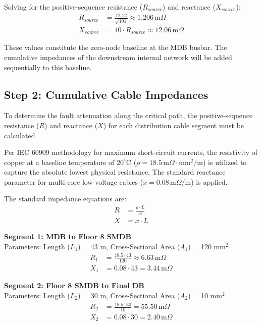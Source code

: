 \documentclass[11pt, a4paper]{article}
\begin{document}
Solving for the positive-sequence resistance ($R_{source}$) and reactance ($X_{source}$):
\begin{align}
    R_{source} &= \frac{12.12}{\sqrt{101}} \approx 1.206 \, \text{m}\Omega \\
    X_{source} &= 10 \cdot R_{source} \approx 12.06 \, \text{m}\Omega
\end{align}

These values constitute the zero-node baseline at the MDB busbar. The cumulative impedances of the downstream internal network will be added sequentially to this baseline.\subsection{Step 2: Cumulative Cable Impedances}
To determine the fault attenuation along the critical path, the positive-sequence resistance ($R$) and reactance ($X$) for each distribution cable segment must be calculated. 

Per IEC 60909 methodology for maximum short-circuit currents, the resistivity of copper at a baseline temperature of $20^{\circ}\text{C}$ ($\rho = 18.5 \, \text{m}\Omega \cdot \text{mm}^2/\text{m}$) is utilized to capture the absolute lowest physical resistance. The standard reactance parameter for multi-core low-voltage cables ($x = 0.08 \, \text{m}\Omega/\text{m}$) is applied.

The standard impedance equations are:
\begin{align}
    R &= \frac{\rho \cdot L}{A} \\
    X &= x \cdot L
\end{align}

\noindent \textbf{Segment 1: MDB to Floor 8 SMDB} \\
Parameters: Length ($L_1$) = 43 m, Cross-Sectional Area ($A_1$) = 120 mm$^2$
\begin{align}
    R_1 &= \frac{18.5 \cdot 43}{120} \approx 6.63 \, \text{m}\Omega \\
    X_1 &= 0.08 \cdot 43 = 3.44 \, \text{m}\Omega
\end{align}

\noindent \textbf{Segment 2: Floor 8 SMDB to Final DB} \\
Parameters: Length ($L_2$) = 30 m, Cross-Sectional Area ($A_2$) = 10 mm$^2$
\begin{align}
    R_2 &= \frac{18.5 \cdot 30}{10} = 55.50 \, \text{m}\Omega \\
    X_2 &= 0.08 \cdot 30 = 2.40 \, \text{m}\Omega
\end{align}
\end{document}
